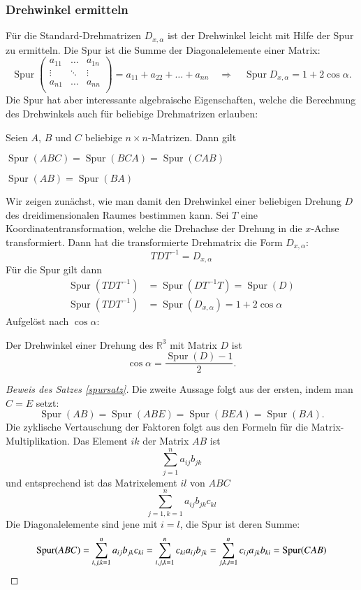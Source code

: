 \subsubsection{Drehwinkel ermitteln}
Für die Standard-Drehmatrizen $D_{x,\alpha}$ ist der Drehwinkel 
leicht mit Hilfe der Spur zu ermitteln.
Die Spur ist die Summe der
Diagonalelemente einer Matrix:
\[
\operatorname{Spur}
\begin{pmatrix}
a_{11}&\dots &a_{1n}\\
\vdots&\ddots&\vdots\\
a_{n1}&\dots &a_{nn}\\
\end{pmatrix}
=a_{11}+a_{22}+\dots+a_{nn}
\quad
\Rightarrow
\quad
\operatorname{Spur}D_{x,\alpha}=1+2\cos\alpha.
\]
Die Spur hat aber interessante algebraische Eigenschaften, welche
die Berechnung des Drehwinkels auch für beliebige Drehmatrizen
erlauben:
\begin{satz}
\label{spursatz}
Seien $A$, $B$ und $C$ beliebige $n\times n$-Matrizen.
Dann gilt
\begin{compactenum}
\item $\operatorname{Spur}(ABC)=\operatorname{Spur}(BCA)=\operatorname{Spur}(CAB)$
\item $\operatorname{Spur}(AB)=\operatorname{Spur}(BA)$
\end{compactenum}
\end{satz}
Wir zeigen zunächst, wie man damit den Drehwinkel einer beliebigen
Drehung $D$ des dreidimensionalen Raumes bestimmen kann.
Sei $T$ eine Koordinatentransformation, welche die Drehachse der Drehung in die
$x$-Achse transformiert.
Dann hat die transformierte Drehmatrix die Form $D_{x,\alpha}$:
\[
TDT^{-1}= D_{x,\alpha}
\]
Für die Spur gilt dann
\begin{align*}
\operatorname{Spur}(TDT^{-1})
&=
\operatorname{Spur}(DT^{-1}T)
=
\operatorname{Spur}(D)
\\
\operatorname{Spur}(TDT^{-1})
&=
\operatorname{Spur}(D_{x,\alpha})=1+2\cos\alpha
\end{align*}
Aufgelöst nach $\cos\alpha$:
\begin{satz}\label{drehwinkelsatz}
Der Drehwinkel einer Drehung des $\mathbb R^3$ mit Matrix $D$ ist
\[
\cos\alpha =\frac{\operatorname{Spur}(D) -1 }2.
\]
\end{satz}

\begin{proof}[Beweis des Satzes \ref{spursatz}]
Die zweite Aussage folgt aus der ersten, indem man $C=E$ setzt:
\[
\operatorname{Spur}(AB)=\operatorname{Spur}(ABE)=\operatorname{Spur}(BEA)=
\operatorname{Spur}(BA).
\]
Die zyklische Vertauschung der Faktoren folgt aus den Formeln für die
Matrix-Multiplikation.
Das Element $ik$ der Matrix $AB$ ist
\[
\sum_{j=1}^na_{ij}b_{jk}
\]
und entsprechend ist das Matrixelement $il$ von $ABC$ 
\[
\sum_{j=1, k=1}^na_{ij}b_{jk}c_{kl}
\]
Die Diagonalelemente sind jene mit $i=l$, die Spur ist deren Summe:
\[
\operatorname{Spur}(ABC)
=\sum_{i,j,k=1}^na_{ij}b_{jk}c_{ki}
=\sum_{i,j,k=1}^nc_{ki}a_{ij}b_{jk}
=\sum_{j,k,i=1}^nc_{ij}a_{jk}b_{ki}
=\operatorname{Spur}(CAB)
\qedhere
\]
\end{proof}

